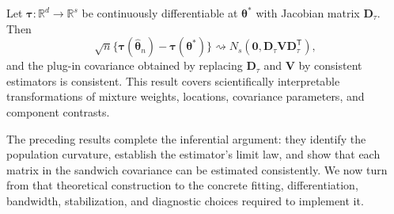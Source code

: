 \begin{corollary}
\label{cor:delta-method}
Let $\boldsymbol{\tau}:\mathbb R^d\to\mathbb R^s$ be continuously
differentiable at $\boldsymbol{\theta}^*$ with Jacobian matrix
$\mathbf{D}_{\tau}$.  Then
\begin{equation}
 \sqrt n\{\boldsymbol{\tau}(\widehat{\boldsymbol{\theta}}_n)
 -\boldsymbol{\tau}(\boldsymbol{\theta}^*)\}
 \rightsquigarrow
 N_s(\mathbf{0},\mathbf{D}_{\tau}\mathbf{V}
                    \mathbf{D}_{\tau}^\mathsf T),
 \label{eq:delta-method}
\end{equation}
and the plug-in covariance obtained by replacing
$\mathbf{D}_{\tau}$ and $\mathbf{V}$ by consistent estimators is consistent.
This result covers scientifically interpretable transformations of mixture
weights, locations, covariance parameters, and component contrasts.
\end{corollary}

The preceding results complete the inferential argument: they identify the
population curvature, establish the estimator's limit law, and show that each
matrix in the sandwich covariance can be estimated consistently. We now turn
from that theoretical construction to the concrete fitting, differentiation,
bandwidth, stabilization, and diagnostic choices required to implement it.
